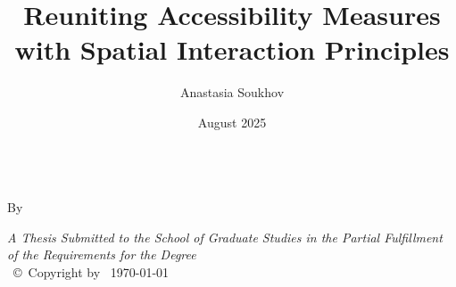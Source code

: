 \documentclass[
11pt, %
oneside, %
english, %
singlespacing, %
]{macthesis} %
\title{Reuniting Accessibility Measures with Spatial Interaction Principles}
\author{Anastasia Soukhov}
\date{August 2025}
\def\blankpage{%
      \clearpage%
      \thispagestyle{empty}%
      \addtocounter{page}{-1}%
      \null%
      \clearpage}
\begin{document}
\sloppy

\frontmatter %

\pagestyle{plain} %

\vspace{6cm}
\begin{center}
\ttitle
\end{center}
\clearpage

\begin{center}

\vfill
\textsc{\Large \ttitle} \\

\vfill
{By \authorname\, \bdeg \, \mdeg }


 \vfill
{\large \textit{A Thesis Submitted to the School of Graduate Studies in the Partial Fulfillment of the Requirements for the Degree \degreename}}\\

\vfill
{\large \univname\, \copyright\, Copyright by \authorname\, \today}\\[4cm] %

\end{center}
\blankpage
\clearpage



\blankpage
\clearpage

\end{document}
